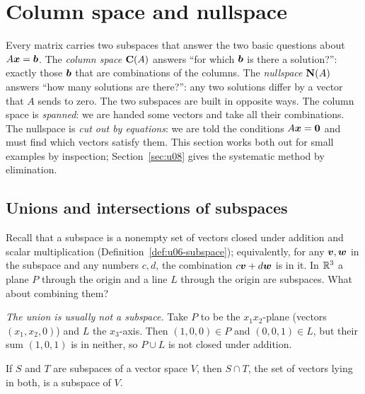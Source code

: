 \section{Column space and nullspace}\label{sec:u07}

Every matrix carries two subspaces that answer the two basic questions about
$A\boldsymbol{x}=\boldsymbol{b}$. The \emph{column space} $\mathbf{C}(A)$ answers ``for which $\boldsymbol{b}$ is there a
solution?'': exactly those $\boldsymbol{b}$ that are combinations of the columns. The
\emph{nullspace} $\mathbf{N}(A)$ answers ``how many solutions are there?'': any two solutions differ
by a vector that $A$ sends to zero. The two subspaces are built in opposite ways. The column
space is \emph{spanned}: we are handed some vectors and take all their combinations. The
nullspace is \emph{cut out by equations}: we are told the conditions $A\boldsymbol{x}=\boldsymbol{0}$ and must
find which vectors satisfy them. This section works both out for small examples by inspection;
Section~\ref{sec:u08} gives the systematic method by elimination.

\subsection{Unions and intersections of subspaces}

Recall that a subspace is a nonempty set of vectors closed under addition and scalar
multiplication (Definition~\ref{def:u06-subspace}); equivalently, for any $\boldsymbol{v},\boldsymbol{w}$ in
the subspace and any numbers $c,d$, the combination $c\boldsymbol{v}+d\boldsymbol{w}$ is in it. In $\mathbb{R}^3$ a plane
$P$ through the origin and a line $L$ through the origin are subspaces. What about combining
them?

\emph{The union is usually not a subspace.} Take $P$ to be the $x_1x_2$-plane (vectors
$(x_1,x_2,0)$) and $L$ the $x_3$-axis. Then $(1,0,0)\in P$ and $(0,0,1)\in L$, but their sum
$(1,0,1)$ is in neither, so $P\cup L$ is not closed under addition.

\begin{theorem}\label{thm:u07-intersection}
If $S$ and $T$ are subspaces of a vector space $V$, then $S\cap T$, the set of vectors lying
in both, is a subspace of $V$.
\end{theorem}

